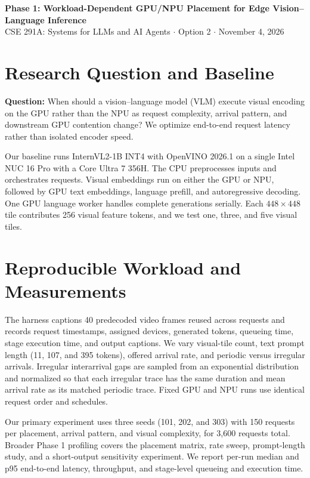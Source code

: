 \documentclass[10pt]{article}
\begin{document}
\begin{center}
    {\Large\bfseries Phase 1: Workload-Dependent GPU/NPU Placement for Edge Vision--Language Inference}\\[0.25em]
    {\small CSE 291A: Systems for LLMs and AI Agents \(\cdot\) Option 2 \(\cdot\) November 4, 2026}
\end{center}

\vspace{-0.4em}

\section{Research Question and Baseline}

\textbf{Question:} When should a vision--language model (VLM) execute visual encoding on the GPU rather than the NPU as request complexity, arrival pattern, and downstream GPU contention change? We optimize end-to-end request latency rather than isolated encoder speed.

Our baseline runs InternVL2-1B INT4 with OpenVINO 2026.1 on a single Intel NUC 16 Pro with a Core Ultra 7 356H. The CPU preprocesses inputs and orchestrates requests. Visual embeddings run on either the GPU or NPU, followed by GPU text embeddings, language prefill, and autoregressive decoding. One GPU language worker handles complete generations serially. Each \(448\times448\) tile contributes 256 visual feature tokens, and we test one, three, and five visual tiles.

\section{Reproducible Workload and Measurements}

The harness captions 40 predecoded video frames reused across requests and records request timestamps, assigned devices, generated tokens, queueing time, stage execution time, and output captions. We vary visual-tile count, text prompt length (11, 107, and 395 tokens), offered arrival rate, and periodic versus irregular arrivals. Irregular interarrival gaps are sampled from an exponential distribution and normalized so that each irregular trace has the same duration and mean arrival rate as its matched periodic trace. Fixed GPU and NPU runs use identical request order and schedules.

Our primary experiment uses three seeds (101, 202, and 303) with 150 requests per placement, arrival pattern, and visual complexity, for 3,600 requests total. Broader Phase 1 profiling covers the placement matrix, rate sweep, prompt-length study, and a short-output sensitivity experiment. We report per-run median and p95 end-to-end latency, throughput, and stage-level queueing and execution time.
\end{document}
